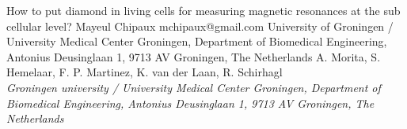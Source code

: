 \begin{conf-abstract}[]
{How to put diamond in living cells for measuring magnetic resonances at the sub cellular level?}
{\color{blue} Mayeul Chipaux}
{mchipaux@gmail.com}
{University of Groningen / University Medical Center Groningen, Department of Biomedical Engineering, Antonius  Deusinglaan 1, 9713 AV Groningen, The Netherlands}
{{\color{blue}A. Morita, S. Hemelaar, F. P. Martinez, K. van der Laan, R. Schirhagl}\\ \textit{Groningen university / University Medical Center Groningen, Department of Biomedical Engineering, Antonius  Deusinglaan 1, 9713 AV Groningen, The Netherlands}\\ 
\decofourleft \decofourright}





\printbibliography[heading=none]

\end{conf-abstract}

